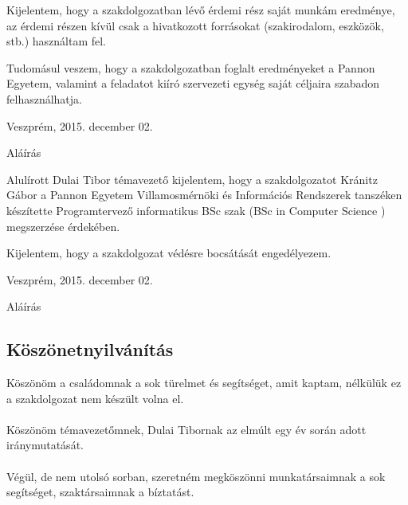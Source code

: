 \documentclass[a4paper,12pt,oneside]{report}
\begin{document}
Kijelentem, hogy a szakdolgozatban lévő érdemi rész saját munkám eredménye, az érdemi részen kívül csak a hivatkozott forrásokat (szakirodalom, eszközök, stb.) használtam fel.

Tudomásul veszem, hogy a szakdolgozatban foglalt eredményeket a Pannon Egyetem, valamint a feladatot kiíró szervezeti egység saját céljaira szabadon felhasználhatja.\\
 
\begin{flushleft}
{Veszprém, 2015. december 02.\\}
\end{flushleft}
 
\begin{flushright}
{Aláírás \vspace{4cm}}
\end{flushright}
 
Alulírott Dulai Tibor témavezető kijelentem, hogy a szakdolgozatot Kránitz Gábor a Pannon Egyetem Villamosmérnöki és Információs Rendszerek tanszéken készítette Programtervező informatikus BSc szak (BSc in Computer Science
) megszerzése érdekében.

Kijelentem, hogy a szakdolgozat védésre bocsátását engedélyezem.\\
 
\begin{flushleft}
{Veszprém, 2015. december 02.\\}
\end{flushleft}
 
\begin{flushright}
{Aláírás}
\end{flushright}
\newpage
\pagebreak
\begin{center}
\section*{Köszönetnyilvánítás}
\end{center}

Köszönöm a családomnak a sok türelmet és segítséget, amit kaptam, nélkülük ez a szakdolgozat nem készült volna el.
\\
\\
Köszönöm témavezetőmnek, Dulai Tibornak az elmúlt egy év során adott iránymutatását.
\\
\\
Végül, de nem utolsó sorban, szeretném megköszönni munkatársaimnak a sok segítséget, szaktársaimnak a bíztatást.
 
\end{document}
